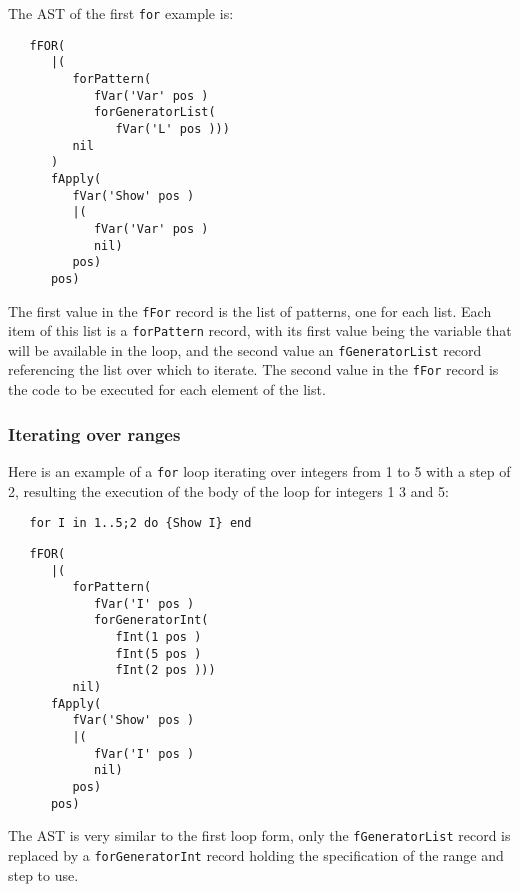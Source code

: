 \documentclass[a4paper]{memoir}
\begin{document}
The AST of the first \lstinline!for! example is:
\begin{lstlisting}
   fFOR(
      |(
         forPattern(
            fVar('Var' pos )
            forGeneratorList(
               fVar('L' pos )))
         nil
      )
      fApply(
         fVar('Show' pos )
         |(
            fVar('Var' pos )
            nil)
         pos)
      pos)
\end{lstlisting}

The first value in the \lstinline!fFor! record is the list of patterns, one
for each list. Each item of this list is a \lstinline!forPattern! record, with
its first value being the variable that will be available in the loop, and the
second value an \lstinline!fGeneratorList! record referencing the list over which to
iterate.
The second value in the \lstinline!fFor! record is the code to be executed for
each element of the list.

\subsubsection{Iterating over ranges}
Here is an example of a \lstinline!for! loop iterating over integers from 1 to 5
with a step of 2, resulting the execution of the body of the loop for integers 1
3 and 5:
\begin{lstlisting}
   for I in 1..5;2 do {Show I} end
\end{lstlisting}

\begin{lstlisting}
   fFOR(
      |(
         forPattern(
            fVar('I' pos )
            forGeneratorInt(
               fInt(1 pos )
               fInt(5 pos )
               fInt(2 pos )))
         nil)
      fApply(
         fVar('Show' pos )
         |(
            fVar('I' pos )
            nil)
         pos)
      pos)
\end{lstlisting}

The AST is very similar to the first loop form, only the
\lstinline!fGeneratorList! record is replaced by a \lstinline!forGeneratorInt!
record holding the specification of the range and step to use.
\end{document}
